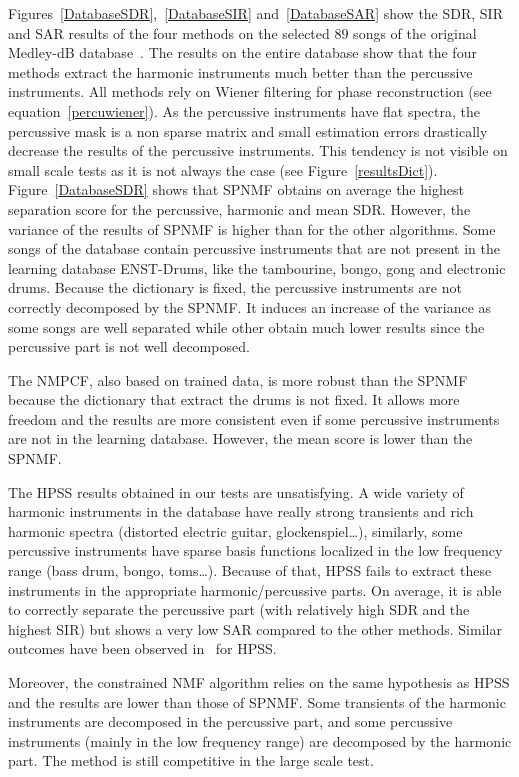 Figures~\ref{DatabaseSDR},~\ref{DatabaseSIR} and~\ref{DatabaseSAR} show the SDR, SIR and SAR results of the four methods on the selected $89$ songs of the original Medley-dB database~\cite{bittner2014medleydb}. The results on the entire database show that the four methods extract the harmonic instruments much better than the percussive instruments. All methods rely on Wiener filtering for phase reconstruction (see equation~\ref{percuwiener}). As the percussive instruments have flat spectra, the percussive mask is a non sparse matrix and small estimation errors drastically decrease the results of the percussive instruments. This tendency is not visible on small scale tests as it is not always the case (see Figure~\ref{resultsDict}). 
Figure~\ref{DatabaseSDR} shows that SPNMF obtains on average the highest separation score for the percussive, harmonic and mean SDR. However, the variance of the results of SPNMF is higher than for the other algorithms. Some songs of the database contain percussive instruments that are not present in the learning database ENST-Drums, like the tambourine, bongo, gong and electronic drums. Because the dictionary is fixed, the percussive instruments are not correctly decomposed by the SPNMF. It induces an increase of the variance as some songs are well separated while other obtain much lower results since the percussive part is not well decomposed.

The NMPCF, also based on trained data, is more robust than the SPNMF because the dictionary that extract the drums is not fixed. It allows more freedom and the results are more consistent even if some percussive instruments are not in the learning database. However, the mean score is lower than the SPNMF.

The HPSS results obtained in our tests are unsatisfying. A wide variety of harmonic instruments in the database have really strong transients and rich harmonic spectra (distorted electric guitar, glockenspiel\ldots), similarly, some percussive instruments have sparse basis functions localized in the low frequency range (bass drum, bongo, toms\ldots). Because of that, HPSS fails to extract these instruments in the appropriate harmonic/percussive parts. On average, it is able to correctly separate the percussive part (with relatively high SDR and the highest SIR) but shows a very low SAR compared to the other methods. Similar outcomes have been observed in~\cite{canadas2014percussive} for HPSS.

Moreover, the constrained NMF algorithm relies on the same hypothesis as HPSS and the results are lower than those of SPNMF. Some transients of the harmonic instruments are decomposed in the percussive part, and some percussive instruments (mainly in the low frequency range) are decomposed by the harmonic part. The method is still competitive in the large scale test. 

